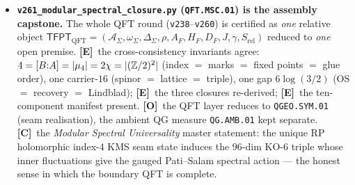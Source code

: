 \documentclass[11pt]{article}
\providecommand{\mE}{\textbf{[E]}}\providecommand{\mC}{\textbf{[C]}}
\providecommand{\mO}{\textbf{[O]}}\providecommand{\mX}{\textbf{[X]}}
\providecommand{\vref}[1]{\texttt{#1}}
\begin{document}
\begin{itemize}
  $E_8$ Cartan is even/$\det1$/positive-definite; \mE\ $H^2(\mathrm{K3},\Z)=U^3\oplus E_8({-}1)^2$ (rank $22$,
  $\det{-}1$, even, signature $(3,19)$); \mE\ the seam is $T^2/(z{\mapsto}{-}z)$ with $4$ marks (orbifold
  Euler char $0$); \mE\ the carrier-$16$ are the $|A[2]|{=}2^4{=}16$ Kummer nodes $=\dim S^+$ (\vref{v197}),
  $16{=}4{\times}4$; \mE\ honest note --- the rank-$16$ Kummer lattice is \emph{not} the $E_8({-}1)^2$
  summand. \mC\ so the \vref{v1} ``glue $D_5{\oplus}A_3{+}\mu_4{\Rightarrow}E_8$'' is the lattice shadow of a
  single object; $E_8$ appears both locally (du Val $\mathbb C^2/2I$, \vref{v232}/\vref{v236}) and globally
  ($H^2$ summand). A unification, not a closure.
\item \textbf{\texttt{v261\_modular\_spectral\_closure.py} (\texttt{QFT.MSC.01}) is the assembly capstone.}
  The whole QFT round (\vref{v238}--\vref{v260}) is certified as \emph{one} relative object
  $\mathsf{TFPT}_{\mathrm{QFT}}=(\mathcal A_\Sigma,\omega_\Sigma,\Delta_\Sigma,\rho,A_F,H_F,D_F,J,\gamma,
  S_{\mathrm{rel}})$ reduced to \emph{one} open premise. \mE\ the cross-consistency invariants agree:
  $4=[B{:}A]=|\mu_4|=2\chi=|(\mathbb{Z}/2)^2|$ (index $=$ marks $=$ fixed points $=$ glue order), one carrier-$16$
  (spinor $=$ lattice $=$ triple), one gap $6\log(3/2)$ (OS $=$ recovery $=$ Lindblad); \mE\ the three
  closures re-derived; \mE\ the ten-component manifest present. \mO\ the QFT layer reduces to
  \texttt{QGEO.SYM.01} (seam realisation), the ambient QG measure \texttt{QG.AMB.01} kept separate. \mC\
  the \emph{Modular Spectral Universality} master statement: the unique RP holomorphic index-$4$ KMS seam
  state induces the $96$-dim KO-$6$ triple whose inner fluctuations give the gauged Pati--Salam spectral
  action --- the honest sense in which the boundary QFT is complete.
\end{itemize}
\end{document}
